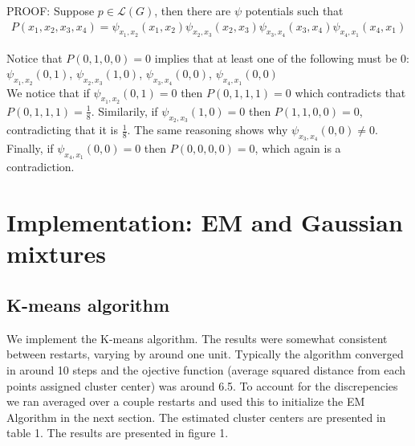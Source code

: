 \documentclass[paper=a4, fontsize=11pt]{scrartcl} %
\numberwithin{equation}{section} %
\numberwithin{figure}{section} %
\numberwithin{table}{section} %
\begin{document}
PROOF: Suppose \(p \in \mathcal{L}(G)\), then there are \(\psi\) potentials such that \begin{align*}
P(x_1,x_2,x_3,x_4)=\psi_{x_1,x_2}(x_1,x_2)\psi_{x_2,x_3}(x_2,x_3)\psi_{x_3,x_4}(x_3,x_4)\psi_{x_4,x_1}(x_4,x_1)
\end{align*}

Notice that $P(0,1,0,0)=0$ implies that at least one of the following must be $0$:
$\psi_{x_1,x_2}(0,1)$,
$\psi_{x_2,x_3}(1,0)$,
$\psi_{x_3,x_4}(0,0)$,
$\psi_{x_4,x_1}(0,0)$
\\

We notice that if $\psi_{x_1,x_2}(0,1)=0$ then $P(0,1,1,1)=0$ which contradicts that $P(0,1,1,1)=\frac{1}{8}$. Similarily, if $\psi_{x_2,x_3}(1,0)=0$ then $P(1,1,0,0)=0$, contradicting that it is \(\frac{1}{8}\). The same reasoning shows why $\psi_{x_3,x_4}(0,0) \ne 0$. Finally, if $\psi_{x_4,x_1}(0,0)=0$ then $P(0,0,0,0)=0$, which again is a contradiction.

\label{key}

\newpage

\section{Implementation: EM and Gaussian mixtures}

\subsection{K-means algorithm}

We implement the K-means algorithm. The results were somewhat consistent between restarts, varying by around one unit. Typically the algorithm converged in around 10 steps and the ojective function (average squared distance from each points assigned cluster center) was around 6.5. To account for the discrepencies we ran averaged over a couple restarts and used this to initialize the EM Algorithm in the next section. The estimated cluster centers are presented in table 1. The results are presented in figure 1.
\end{document}

